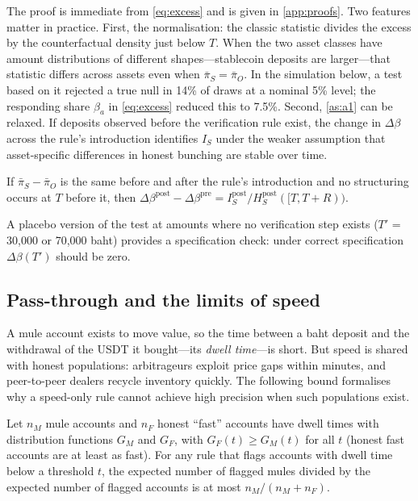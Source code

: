 The proof is immediate from \cref{eq:excess} and is given in \cref{app:proofs}. Two features matter in practice. First,
the normalisation: the classic statistic divides the excess by the counterfactual density just below $T$. When the two
asset classes have amount distributions of different shapes---stablecoin deposits are larger---that statistic differs
across assets even when $\bar\pi_S=\bar\pi_O$. In the simulation below, a test based on it rejected a true null in 14\%
of draws at a nominal 5\% level; the responding share $\beta_a$ in \cref{eq:excess} reduced this to 7.5\%. Second,
\cref{as:a1} can be relaxed. If deposits observed before the verification rule exist, the change in $\Delta\beta$ across
the rule's introduction identifies $I_S$ under the weaker assumption that asset-specific differences in honest bunching
are stable over time.

\begin{corollary}\label{cor:didib}
If $\bar\pi_S-\bar\pi_O$ is the same before and after the rule's introduction and no structuring occurs at $T$ before
it, then $\Delta\beta^{\text{post}}-\Delta\beta^{\text{pre}}=I_S^{\text{post}}/H_S^{\text{post}}([T,T+R))$.
\end{corollary}

A placebo version of the test at amounts where no verification step exists ($T'$ = 30,000 or 70,000 baht) provides a
specification check: under correct specification $\Delta\beta(T')$ should be zero.

\subsection{Pass-through and the limits of speed}\label{sec:speed}

A mule account exists to move value, so the time between a baht deposit and the withdrawal of the USDT it bought---its
\emph{dwell time}---is short. But speed is shared with honest populations: arbitrageurs exploit price gaps within
minutes, and peer-to-peer dealers recycle inventory quickly. The following bound formalises why a speed-only rule
cannot achieve high precision when such populations exist.

\begin{lemma}\label{lem:speed}
Let $n_M$ mule accounts and $n_F$ honest ``fast'' accounts have dwell times with distribution functions $G_M$ and
$G_F$, with $G_F(t)\geq G_M(t)$ for all $t$ (honest fast accounts are at least as fast). For any rule that flags
accounts with dwell time below a threshold $t$, the expected number of flagged mules divided by the expected number of
flagged accounts is at most $n_M/(n_M+n_F)$.
\end{lemma}


